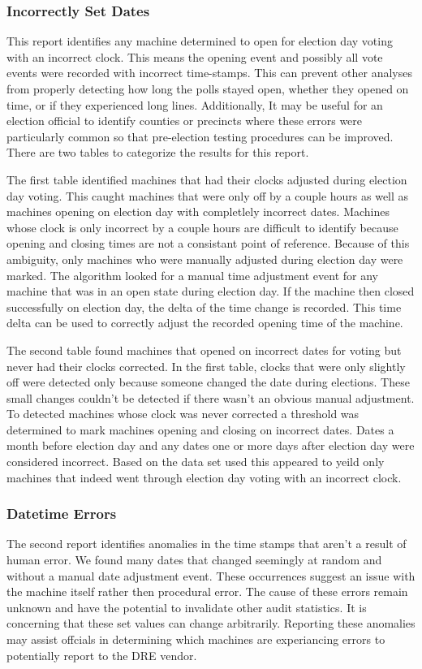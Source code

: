 \subsubsection{Incorrectly Set Dates}
This report identifies any machine determined to open for election day voting with an incorrect clock.  This means the opening event and possibly all vote events were recorded with incorrect time-stamps. This can prevent other analyses from properly detecting how long the polls stayed open, whether they opened on time, or if they experienced long lines. Additionally, It may be useful for an election official to identify counties or precincts where these errors were particularly common so that pre-election testing procedures can be improved. There are two tables to categorize the results for this report.

The first table identified machines that had their clocks adjusted during election day voting. This caught machines that were only off by a couple hours as well as machines opening on election day with completlely incorrect dates.  Machines whose clock is only incorrect by a couple hours are difficult to identify because opening and closing times are not a consistant point of reference. Because of this ambiguity, only machines who were manually adjusted during election day were marked. The algorithm looked for a manual time adjustment event for any machine that was in an open state during election day.  If the machine then closed successfully on election day, the delta of the time change is recorded. This time delta can be used to correctly adjust the recorded opening time of the machine.

The second table found machines that opened on incorrect dates for
voting but never had their clocks corrected. In the first table, clocks
that were only slightly off were detected only because someone changed
the date during elections.  These small changes couldn't be detected if
there wasn't an obvious manual adjustment. To detected machines whose
clock was never corrected a threshold was determined to mark machines
opening and closing on incorrect dates. Dates a month before
election day and any dates one or more days after election day were
considered incorrect.  Based on the data set used this appeared to yeild
only machines that indeed went through election day voting with an
incorrect clock.

\subsubsection{Datetime Errors}
The second report identifies anomalies in the time stamps that aren't a result of human error. We found many dates that changed seemingly at random and without a manual date adjustment event. These occurrences suggest an issue with the machine itself rather then procedural error. The cause of these errors remain unknown and have the potential to invalidate other audit statistics. It is concerning that these set values can change arbitrarily. Reporting these anomalies may assist offcials in determining which machines are experiancing errors to potentially report to the DRE vendor.

